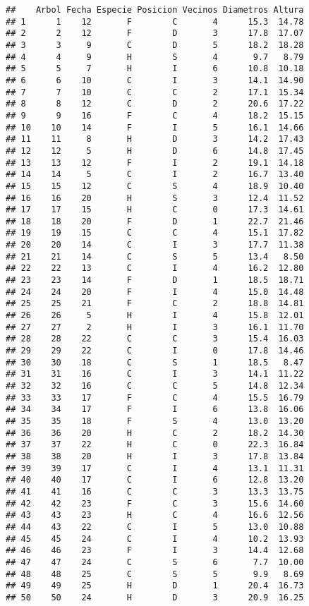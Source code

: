 \documentclass[
]{article}
\begin{document}
\begin{verbatim}
##    Arbol Fecha Especie Posicion Vecinos Diametros Altura
## 1      1    12       F        C       4      15.3  14.78
## 2      2    12       F        D       3      17.8  17.07
## 3      3     9       C        D       5      18.2  18.28
## 4      4     9       H        S       4       9.7   8.79
## 5      5     7       H        I       6      10.8  10.18
## 6      6    10       C        I       3      14.1  14.90
## 7      7    10       C        C       2      17.1  15.34
## 8      8    12       C        D       2      20.6  17.22
## 9      9    16       F        C       4      18.2  15.15
## 10    10    14       F        I       5      16.1  14.66
## 11    11     8       H        D       3      14.2  17.43
## 12    12     5       H        D       6      14.8  17.45
## 13    13    12       F        I       2      19.1  14.18
## 14    14     5       C        I       2      16.7  13.40
## 15    15    12       C        S       4      18.9  10.40
## 16    16    20       H        S       3      12.4  11.52
## 17    17    15       H        C       0      17.3  14.61
## 18    18    20       F        D       1      22.7  21.46
## 19    19    15       C        C       4      15.1  17.82
## 20    20    14       C        I       3      17.7  11.38
## 21    21    14       C        S       5      13.4   8.50
## 22    22    13       C        I       4      16.2  12.80
## 23    23    14       F        D       1      18.5  18.71
## 24    24    20       F        I       4      15.0  14.48
## 25    25    21       F        C       2      18.8  14.81
## 26    26     5       H        I       4      15.8  12.01
## 27    27     2       H        I       3      16.1  11.70
## 28    28    22       C        C       3      15.4  16.03
## 29    29    22       C        I       0      17.8  14.46
## 30    30    18       C        S       1      18.5   8.47
## 31    31    16       C        I       3      14.1  11.22
## 32    32    16       C        C       5      14.8  12.34
## 33    33    17       F        C       4      15.5  16.79
## 34    34    17       F        I       6      13.8  16.06
## 35    35    18       F        S       4      13.0  13.20
## 36    36    20       H        C       2      18.2  14.30
## 37    37    22       H        C       0      22.3  16.84
## 38    38    20       H        I       3      17.8  13.84
## 39    39    17       C        I       4      13.1  11.31
## 40    40    17       C        I       6      12.8  13.20
## 41    41    16       C        C       3      13.3  13.75
## 42    42    23       F        C       3      15.6  14.60
## 43    43    23       H        C       4      16.6  12.56
## 44    43    22       C        I       5      13.0  10.88
## 45    45    24       C        I       4      10.2  13.93
## 46    46    23       F        I       3      14.4  12.68
## 47    47    24       C        S       6       7.7  10.00
## 48    48    25       C        S       5       9.9   8.69
## 49    49    25       H        D       1      20.4  16.73
## 50    50    24       H        D       3      20.9  16.25
\end{verbatim}
\end{document}
